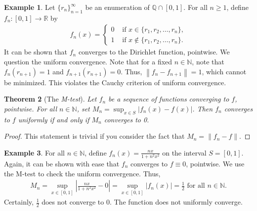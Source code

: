 \documentclass[15pt,a4paper]{book}
\newtheorem{theorem}{Theorem}[chapter]
\theoremstyle{definition}
\newtheorem{example}[theorem]{Example}
\newcommand{\eax}[1]{\emph{#1}\index{#1}} %
\newcommand{\abs}[1]{\left| #1 \right|} %
\newcommand{\N}{\mathbb{N}} %
\newcommand{\R}{\mathbb{R}} %
\newcommand{\Q}{\mathbb{Q}} %
\newcommand{\norm}[1]{\left\lVert#1\right\rVert}
\begin{document}
\begin{example}
    Let $\{r_{n}\}_{n=1}^{\infty}$ be an enumeration of $\Q \cap [0,1]$. For all $n \geq 1$, define $f_{n}:[0,1] \to \R$ by
    \begin{align}
        f_{n}(x) = \begin{cases}
            0 &\text{ if } x \in \{r_{1},r_{2},\ldots,r_{n}\},\\
            1 &\text{ if } x \notin \{r_{1},r_{2},\ldots,r_{n}\}.
        \end{cases}
    \end{align}
    It can be shown that $f_{n}$ converges to the Dirichlet function, pointwise. We question the uniform convergence. Note that for a fixed $n \in \N$, note that $f_{n}(r_{n+1}) = 1$ and $f_{n+1}(r_{n+1}) = 0$. Thus, $\norm{f_{n}-f_{n+1}} = 1$, which cannot be minimized. This violates the Cauchy criterion of uniform convergence.
\end{example}

\begin{theorem}[The \eax{M-test}]
    Let $f_{n}$ be a sequence of functions converging to $f$, pointwise. For all $n \in \N$, set $M_{n} = \sup_{x \in S} \abs{f_{n}(x)-f(x)}$. Then $f_{n}$ converges to $f$ uniformly if and only if $M_{n}$ converges to 0.
\end{theorem}
\begin{proof}
    This statement is trivial if you consider the fact that $M_{n} = \norm{f_{n}-f}$.
\end{proof}

\begin{example}
    For all $n \in \N$, define $f_{n}(x) = \frac{nx}{1+n^{2}x^{2}}$ on the interval $S = [0,1]$. Again, it can be shown with ease that $f_{n}$ converges to $f \equiv 0$, pointwise. We use the M-test to check the uniform convergence. Thus,
    \begin{align}
        M_{n} = \sup_{x \in [0,1]} \abs{\frac{nx}{1+n^{2}x^{2}} - 0} = \sup_{x \in [0,1]}\abs{f_{n}(x)} = \frac{1}{2} \text{ for all } n \in \N.
    \end{align}
    Certainly, $\frac{1}{2}$ does not converge to 0. The function does not uniformly converge.
\end{example}
\end{document}
